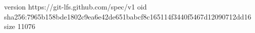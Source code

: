 version https://git-lfs.github.com/spec/v1
oid sha256:7965b158bde1802c9ea6e42de651babcf8c165114f3440f5467d12090712dd16
size 11076
